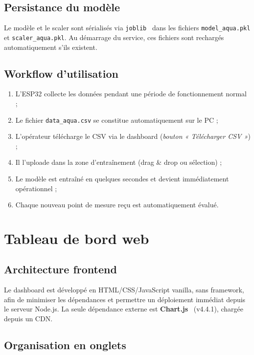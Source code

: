 \documentclass[12pt,a4paper]{report}
\newcommand{\code}[1]{\texttt{\small\colorbox{codebg}{#1}}}
\begin{document}
\section{Persistance du modèle}

Le modèle et le scaler sont sérialisés via \code{joblib}~\cite{sklearn} dans les fichiers
\code{model\_aqua.pkl} et \code{scaler\_aqua.pkl}. Au démarrage du service,
ces fichiers sont rechargés automatiquement s'ils existent.

\section{Workflow d'utilisation}

\begin{enumerate}
  \item L'ESP32 collecte les données pendant une période de fonctionnement normal ;
  \item Le fichier \code{data\_aqua.csv} se constitue automatiquement sur le PC ;
  \item L'opérateur télécharge le CSV via le dashboard (\textit{bouton « Télécharger CSV »}) ;
  \item Il l'uploade dans la zone d'entraînement (drag \& drop ou sélection) ;
  \item Le modèle est entraîné en quelques secondes et devient immédiatement opérationnel ;
  \item Chaque nouveau point de mesure reçu est automatiquement évalué.
\end{enumerate}

\chapter{Tableau de bord web}

\section{Architecture frontend}

Le dashboard est développé en HTML/CSS/JavaScript vanilla, sans framework, afin
de minimiser les dépendances et permettre un déploiement immédiat depuis le serveur
Node.js. La seule dépendance externe est \textbf{Chart.js}~\cite{chartjs} (v4.4.1),
chargée depuis un CDN.

\section{Organisation en onglets}
\end{document}
